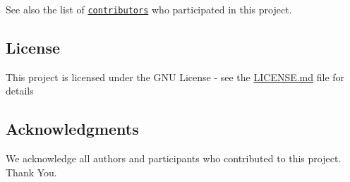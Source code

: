 See also the list of \href{https://github.com/Course-OO-modeling/Trafo/contributors}{\tt contributors} who participated in this project.

\subsection*{License}

This project is licensed under the G\+NU License -\/ see the \hyperlink{md__l_i_c_e_n_s_e}{L\+I\+C\+E\+N\+SE.md} file for details

\subsection*{Acknowledgments}


\begin{DoxyItemize}
\item We acknowledge all authors and participants who contributed to this project. Thank You. 
\end{DoxyItemize}